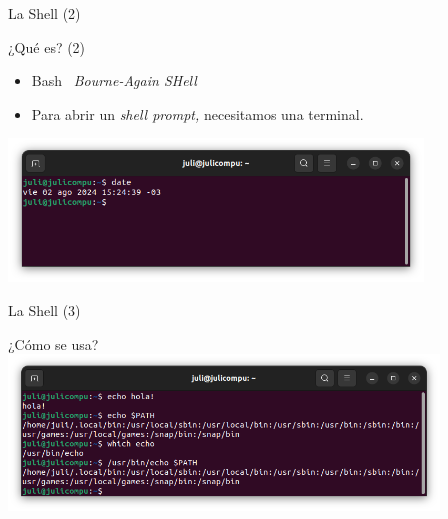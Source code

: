 \begin{frame}{La Shell (2)}
    \begin{block}{¿Qué es? (2)}
        \begin{itemize}
                \item Bash \hookrightarrow\ \textit{Bourne-Again SHell}
            \pause
            \item Para abrir un \textit{shell prompt,} necesitamos una terminal.
            \pause
        \end{itemize}
    \begin{centering}
    \includegraphics[height=1.5in]{images/bash-1.png}        
    \end{centering}
    \end{block}

\end{frame}

\begin{frame}{La Shell (3)}
    \begin{block}{¿Cómo se usa?}
        \centering
        \includegraphics[width=4.5in]{images/bash-2.png}
    \end{block}
    
\end{frame}

